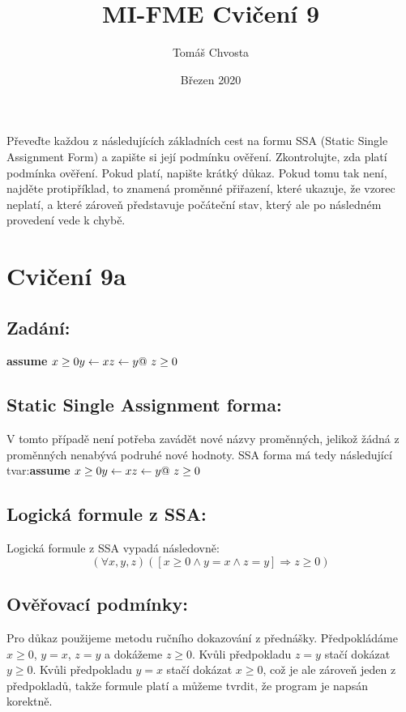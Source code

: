 \documentclass{article}
\title{MI-FME Cvičení 9}
\author{Tomáš Chvosta}
\date{Březen 2020}
\begin{document}
\maketitle

Převeďte každou z následujících základních cest na formu SSA (Static Single Assignment Form) a zapište si její
podmínku ověření. Zkontrolujte, zda platí podmínka ověření. Pokud platí, napište krátký důkaz. Pokud tomu tak není, najděte protipříklad, to znamená proměnné přiřazení, které ukazuje, že vzorec neplatí, a které zároveň představuje počáteční stav, který ale po následném provedení vede k chybě.

\section{Cvičení 9a}

\subsection{Zadání:}
    \textbf{assume} $x \geq 0 \newline y \leftarrow x \newline z \leftarrow y \newline @ \ z \geq 0$


\subsection{Static Single Assignment forma:}

V tomto případě není potřeba zavádět nové názvy proměnných, jelikož žádná z proměnných nenabývá podruhé nové hodnoty. SSA forma má tedy následující tvar:\newline\newline \textbf{assume} $x \geq 0 \newline y \leftarrow x \newline z \leftarrow y \newline @ \ z \geq 0$


\subsection{Logická formule z SSA:}

Logická formule z SSA vypadá následovně:
$$(\forall x, y, z )([ x \geq 0 \wedge y = x \wedge z = y ] \Rightarrow z \geq 0) $$

\subsection{Ověřovací podmínky:}
Pro důkaz použijeme metodu ručního dokazování z přednášky. Předpokládáme $x \geq 0$, $y = x$, $z = y$ a dokážeme $z \geq 0$. Kvůli předpokladu $z = y$ stačí dokázat $y \geq 0$. Kvůli předpokladu $y = x$ stačí dokázat $x \geq 0$, což je ale zároveň jeden z předpokladů, takže formule platí a můžeme tvrdit, že program je napsán korektně.
\end{document}
